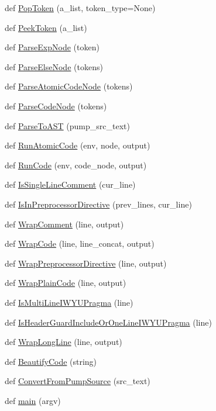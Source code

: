 \begin{DoxyCompactItemize}
def \hyperlink{namespacepump_a45e1d5d5c1c188fc53eee8bd1e00e6b0}{Pop\+Token} (a\+\_\+list, token\+\_\+type=None)
\item 
def \hyperlink{namespacepump_ab12085e099ab4bd0cd968efdc435ec31}{Peek\+Token} (a\+\_\+list)
\item 
def \hyperlink{namespacepump_af62b08489d90e69d0577e82c98383ba7}{Parse\+Exp\+Node} (token)
\item 
def \hyperlink{namespacepump_ae40493525a993e81929c6905e329a406}{Parse\+Else\+Node} (tokens)
\item 
def \hyperlink{namespacepump_a5532710f334f026f80fc485decf5078e}{Parse\+Atomic\+Code\+Node} (tokens)
\item 
def \hyperlink{namespacepump_aabbc064b8664abbe05618b3a0f5a6c38}{Parse\+Code\+Node} (tokens)
\item 
def \hyperlink{namespacepump_a56ac10a83a3a875d305c9aae71fc0549}{Parse\+To\+A\+ST} (pump\+\_\+src\+\_\+text)
\item 
def \hyperlink{namespacepump_a901e6abd34691a0d779178a615cc09c1}{Run\+Atomic\+Code} (env, node, output)
\item 
def \hyperlink{namespacepump_ac6a714a44e28c2a19a1dfabeb9c9d4f1}{Run\+Code} (env, code\+\_\+node, output)
\item 
def \hyperlink{namespacepump_a417078b1d036b67756c47e5dc50324dc}{Is\+Single\+Line\+Comment} (cur\+\_\+line)
\item 
def \hyperlink{namespacepump_aa33101b01d5781710262f3b5dadd8bc8}{Is\+In\+Preprocessor\+Directive} (prev\+\_\+lines, cur\+\_\+line)
\item 
def \hyperlink{namespacepump_a73951c98652038351b1cd24291433e12}{Wrap\+Comment} (line, output)
\item 
def \hyperlink{namespacepump_a42502545a37fcd4513a0a7ac8ef3c0eb}{Wrap\+Code} (line, line\+\_\+concat, output)
\item 
def \hyperlink{namespacepump_a59e8ae06bae068d2d72df4f0340635d8}{Wrap\+Preprocessor\+Directive} (line, output)
\item 
def \hyperlink{namespacepump_a60723738cc38d8ced7e2cfecc72d8b11}{Wrap\+Plain\+Code} (line, output)
\item 
def \hyperlink{namespacepump_a707a3ff4514c89607e48a87589aed787}{Is\+Multi\+Line\+I\+W\+Y\+U\+Pragma} (line)
\item 
def \hyperlink{namespacepump_ac8a553b60dc83d100361a0e98d98451b}{Is\+Header\+Guard\+Include\+Or\+One\+Line\+I\+W\+Y\+U\+Pragma} (line)
\item 
def \hyperlink{namespacepump_a02427e2ddc80f0f408e27dfc3e38e702}{Wrap\+Long\+Line} (line, output)
\item 
def \hyperlink{namespacepump_a3456db8d85605892d670669c4e238cd7}{Beautify\+Code} (string)
\item 
def \hyperlink{namespacepump_a568fe53d1443489ac15bac4a0f9faf91}{Convert\+From\+Pump\+Source} (src\+\_\+text)
\item 
def \hyperlink{namespacepump_abcf26971f7bdbad77c2c168c110312df}{main} (argv)
\end{DoxyCompactItemize}
